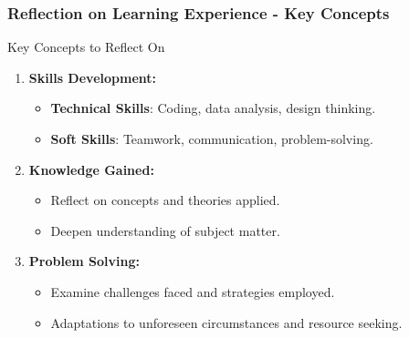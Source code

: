 \documentclass[aspectratio=169]{beamer}
\begin{document}
\begin{frame}[fragile]
    \frametitle{Reflection on Learning Experience - Key Concepts}
    \begin{block}{Key Concepts to Reflect On}
        \begin{enumerate}
            \item \textbf{Skills Development:}
            \begin{itemize}
                \item \textbf{Technical Skills}: Coding, data analysis, design thinking.
                \item \textbf{Soft Skills}: Teamwork, communication, problem-solving.
            \end{itemize}
            
            \item \textbf{Knowledge Gained:}
            \begin{itemize}
                \item Reflect on concepts and theories applied.
                \item Deepen understanding of subject matter.
            \end{itemize}
            
            \item \textbf{Problem Solving:}
            \begin{itemize}
                \item Examine challenges faced and strategies employed.
                \item Adaptations to unforeseen circumstances and resource seeking.
            \end{itemize}
        \end{enumerate}        
    \end{block}
\end{frame}
\end{document}
